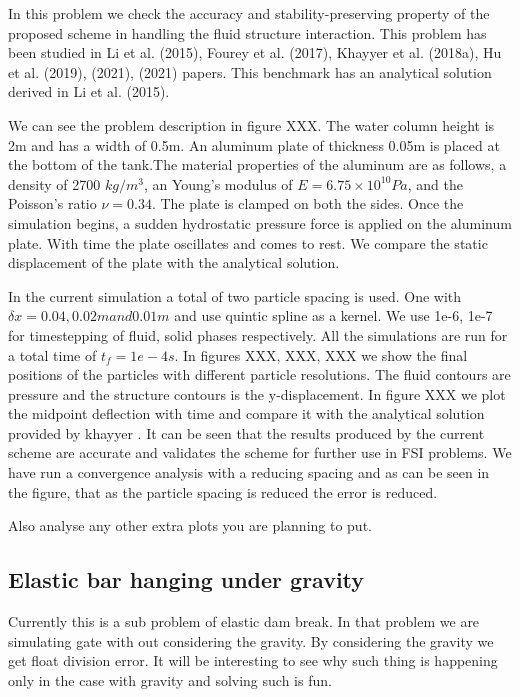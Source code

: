 \documentclass[preprint,12pt]{elsarticle}
\begin{document}
In this problem we check the accuracy and stability-preserving property of the
proposed scheme in handling the fluid structure interaction. This problem has
been studied in Li et al. (2015), Fourey et al. (2017), Khayyer et
al. (2018a), Hu et al. (2019), (2021), (2021) papers. This benchmark has an
analytical solution derived in Li et al. (2015).

We can see the problem description in figure XXX. The water column height is
2m and has a width of 0.5m. An aluminum plate of thickness 0.05m is placed at
the bottom of the tank.The material properties of the aluminum are as follows,
a density of 2700 $kg/m^3$, an Young’s modulus of $E = 6.75 \times 10^{10} Pa$,
and the Poisson’s ratio $\nu = 0.34$. The plate is clamped on both the
sides. Once the simulation begins, a sudden hydrostatic pressure force is
applied on the aluminum plate. With time the plate oscillates and comes to
rest. We compare the static displacement of the plate with the analytical
solution.

In the current simulation a total of two particle spacing is used. One with
$\delta x = 0.04 , 0.02m and 0.01 m$ and use quintic spline as a kernel. We
use 1e-6, 1e-7 for timestepping of fluid, solid phases respectively. All the
simulations are run for a total time of $t_f = 1e-4s$. In figures XXX, XXX,
XXX we show the final positions of the particles with different particle
resolutions. The fluid contours are pressure and the structure contours is the
y-displacement. In figure XXX we plot the midpoint deflection with time and
compare it with the analytical solution provided by khayyer . It can be seen
that the results produced by the current scheme are accurate and validates the
scheme for further use in FSI problems. We have run a convergence analysis
with a reducing spacing and as can be seen in the figure, that as the particle
spacing is reduced the error is reduced.

Also analyse any other extra plots you are planning to put.




\subsection{Elastic bar hanging under gravity}
\label{sec:elastic-bar-hanging}


Currently this is a sub problem of elastic dam break. In that problem we are
simulating gate with out considering the gravity. By considering the gravity
we get float division error. It will be interesting to see why such thing is
happening only in the case with gravity and solving such is fun.
\end{document}
